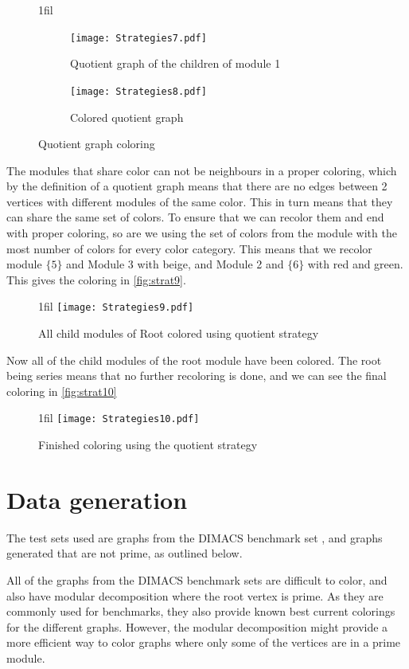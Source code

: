 \documentclass[a4paper]{article}
\makeatletter
\newcommand*{\centerfloat}{%
  \parindent \z@
  \leftskip \z@ \@plus 1fil \@minus \textwidth
  \rightskip\leftskip
  \parfillskip \z@skip}
\makeatother
\begin{document}
\begin{figure}[H]
\centerfloat
    \begin{subfigure}{\pairwidth}
        \texttt{[image: Strategies7.pdf]}
      \caption{Quotient graph of the children of module 1}
      \label{fig:strat7}
    \end{subfigure}%
    \begin{subfigure}{\pairwidth}
        \texttt{[image: Strategies8.pdf]}
      \caption{Colored quotient graph}
      \label{fig:strat8}
    \end{subfigure}

    \caption{Quotient graph coloring}
\end{figure}

The modules that share color can not be neighbours in a proper coloring,
which by the definition of a quotient graph means that there are no edges
between 2 vertices with different modules of the same color. This in turn means
that they can share the same set of colors. To ensure that we can recolor them
and end with proper coloring, so are we using the set of colors from the module
with the most number of colors for every color category. This means that we
recolor module $\{5\}$ and Module 3 with beige, and Module 2 and $\{6\}$ with
red and green. This gives the coloring in \autoref{fig:strat9}.

\begin{figure}[H]
    \centerfloat
    \texttt{[image: Strategies9.pdf]}
    \caption{All child modules of Root colored using quotient strategy}
    \label{fig:strat9}
\end{figure}

Now all of the child modules of the root module have been colored. The root
being series means that no further recoloring is done, and we can see the final
coloring in \autoref{fig:strat10}
\begin{figure}[H]
    \centerfloat
    \texttt{[image: Strategies10.pdf]}
    \caption{Finished coloring using the quotient strategy}
    \label{fig:strat10}
\end{figure}

\section{Data generation}
\label{sec:Data}

The test sets used are graphs from the DIMACS benchmark set \cite{DIMACS}, 
and graphs generated that are not prime, as outlined below.

All of the graphs from the DIMACS benchmark sets are difficult to color,
and also have modular decomposition where the root vertex is prime. As they are
commonly used for benchmarks, they also provide known best current colorings for the
different graphs. However, the modular decomposition might provide a more
efficient way to color graphs where only some of the vertices are in a prime module. 
\end{document}
